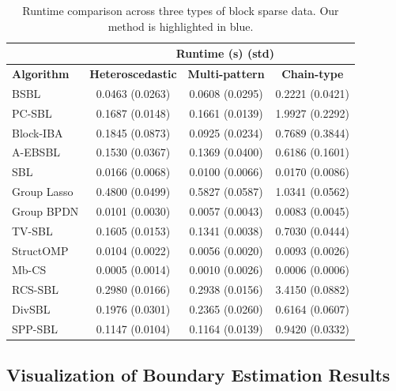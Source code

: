 \documentclass[lettersize,journal]{IEEEtran}
\theoremstyle{remark}
\begin{document}
\begin{table}[!t]
	\centering
	\caption{Runtime comparison across three types of block sparse data. 
			Our method is highlighted in \colorbox{customblue}{blue}.}
	\label{tab:runtime_all}
	\begin{tabularx}{\linewidth}{lccc}
		\toprule
		\multicolumn{4}{c}{~~~~~~~~~~~~~~\textbf{Runtime (s) (std)}} \\ 
		\midrule
		\textbf{Algorithm} &
		\textbf{Heteroscedastic} &
		\textbf{Multi-pattern} &
		\textbf{Chain-type} \\
		\midrule
		BSBL        & 0.0463 (0.0263)& 0.0608 (0.0295) &  0.2221 (0.0421)\\
		PC-SBL      & 0.1687 (0.0148)&  0.1661 (0.0139)& 1.9927 (0.2292)  \\
		Block-IBA   & 0.1845 (0.0873)     & 0.0925 (0.0234) & 0.7689 (0.3844) \\
		A-EBSBL     & 0.1530 (0.0367)&0.1369 (0.0400)  &  0.6186 (0.1601)\\
		SBL         & 0.0166 (0.0068)& 0.0100 (0.0066) & 0.0170 (0.0086) \\
		Group Lasso & 0.4800 (0.0499)& 0.5827 (0.0587) &  1.0341 (0.0562)\\
		Group BPDN  & 0.0101 (0.0030)&  0.0057 (0.0043)& 0.0083 (0.0045) \\
		TV-SBL      & 0.1605 (0.0153)& 0.1341 (0.0038) & 0.7030 (0.0444) \\
		StructOMP   & 0.0104 (0.0022)     & 0.0056 (0.0020) &  0.0093 (0.0026)\\
		Mb-CS &  0.0005 (0.0014) & 0.0010 (0.0026) & 0.0006 (0.0006) \\
		RCS-SBL &  0.2980 (0.0166) &  0.2938 (0.0156)& 3.4150 (0.0882)\\
		DivSBL      & 0.1976 (0.0301) & 0.2365 (0.0260) & 0.6164 (0.0607) \\
		\rowcolor{customblue}
		SPP-SBL & 0.1147 (0.0104)&  0.1164 (0.0139)&  0.9420 (0.0332)\\
		\bottomrule
	\end{tabularx}
\end{table}







\subsection{Visualization of Boundary Estimation Results} \label{visualize beta}
\end{document}
